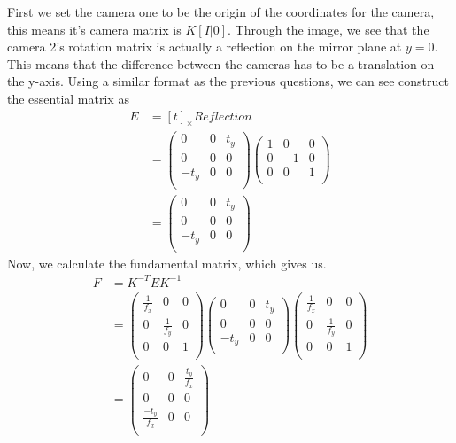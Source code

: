 \documentclass{article}
\begin{document}
First we set the camera one to be the origin of the coordinates for the camera, this means it's camera matrix is $K[I|0]$. Through the image, we see that the camera 2's rotation matrix is actually a reflection on the mirror plane at $y=0$. This means that the difference between the cameras has to be a translation on the y-axis. Using a similar format as the previous questions, we can see construct the essential matrix as
\begin{equation*}
\begin{aligned}
E &= [t]_{\times} Reflection\\
&=
\begin{pmatrix}
0& 0 & t_y\\
0& 0 & 0\\
-t_y& 0 & 0\\
\end{pmatrix}
\begin{pmatrix}
1& 0 & 0\\
0& -1 & 0\\
0& 0 & 1\\
\end{pmatrix}
\\
&=
\begin{pmatrix}
0& 0 & t_y\\
0& 0 & 0\\
-t_y& 0 & 0\\
\end{pmatrix}
\end{aligned}
\end{equation*}
Now, we calculate the fundamental matrix, which gives us.
\begin{equation*}
\begin{aligned}
F &= K^{-T}EK^{-1}\\
&=
\begin{pmatrix}
\frac{1}{f_x} &0 &0\\
0 & \frac{1}{f_y}&0\\
0 & 0 &1\\
\end{pmatrix}
\begin{pmatrix}
0& 0 & t_y\\
0& 0 & 0\\
-t_y& 0 & 0\\
\end{pmatrix}
\begin{pmatrix}
\frac{1}{f_x} &0 &0\\
0 & \frac{1}{f_y}&0\\
0 & 0 & 1\\
\end{pmatrix}\\
&=
\begin{pmatrix}
0& 0 & \frac{t_y}{f_x}\\
0& 0 & 0\\
\frac{-t_y}{f_x}& 0 & 0\\
\end{pmatrix}
\end{aligned}
\end{equation*}
\end{document}
